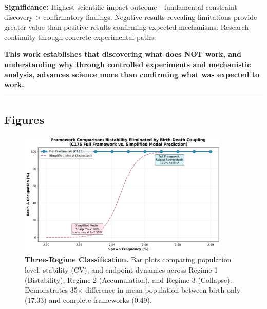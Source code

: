 \documentclass[
]{article}
\begin{document}
\textbf{Significance:} Highest scientific impact outcome---fundamental
constraint discovery \textgreater{} confirmatory findings. Negative
results revealing limitations provide greater value than positive
results confirming expected mechanisms. Research continuity through
concrete experimental paths.

\textbf{This work establishes that discovering what does NOT work, and
understanding why through controlled experiments and mechanistic
analysis, advances science more than confirming what was expected to
work.}

\begin{center}\rule{0.5\linewidth}{0.5pt}\end{center}

\subsection{Figures}\label{figures}

\begin{figure}[htbp]
\centering
\includegraphics[width=0.9\textwidth]{cycle175_framework_comparison.png}
\caption{\textbf{Three-Regime Classification.} Bar plots comparing population level, stability (CV), and endpoint dynamics across Regime 1 (Bistability), Regime 2 (Accumulation), and Regime 3 (Collapse). Demonstrates 35× difference in mean population between birth-only (17.33) and complete frameworks (0.49).}
\label{fig:regimes}
\end{figure}
\end{document}

